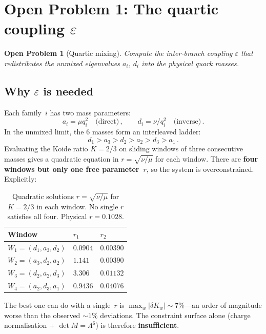 \documentclass[12pt,a4paper]{article}
\newtheorem{problem}{Open Problem}
\begin{document}
\section{Open Problem 1: The quartic coupling $\varepsilon$}
\label{sec:quartic}

\begin{problem}[Quartic mixing]
Compute the inter-branch coupling $\varepsilon$ that redistributes the
unmixed eigenvalues $a_i$, $d_i$ into the physical quark masses.
\end{problem}

\subsection{Why $\varepsilon$ is needed}

Each family~$i$ has two mass parameters:
\begin{equation}
  a_i = \mu q_i^2 \quad \text{(direct)}\,, \qquad
  d_i = \nu/q_i^2 \quad \text{(inverse)}\,.
\end{equation}
In the unmixed limit, the 6 masses form an interleaved ladder:
\begin{equation}
  d_1 > a_3 > d_2 > a_2 > d_3 > a_1\,.
\end{equation}
Evaluating the Koide ratio $K = 2/3$ on sliding windows of three
consecutive masses gives a quadratic equation in $r = \sqrt{\nu/\mu}$
for each window.  There are \textbf{four windows but only one free
parameter~$r$}, so the system is overconstrained.  Explicitly:

\begin{table}[h]
\centering
\caption{Quadratic solutions $r = \sqrt{\nu/\mu}$ for $K = 2/3$ in each window.
No single $r$ satisfies all four.  Physical $r = 0.1028$.}
\begin{tabular}{lll}
  \toprule
  Window & $r_1$ & $r_2$ \\
  \midrule
  $W_1 = (d_1, a_3, d_2)$ & $0.0904$ & $0.00390$ \\
  $W_2 = (a_3, d_2, a_2)$ & $1.141$ & $0.00390$ \\
  $W_3 = (d_2, a_2, d_3)$ & $3.306$ & $0.01132$ \\
  $W_4 = (a_2, d_3, a_1)$ & $0.9436$ & $0.04076$ \\
  \bottomrule
\end{tabular}
\end{table}

\noindent The best one can do with a single~$r$ is
$\max_w |\delta K_w| \sim 7\%$---an order of magnitude worse than
the observed $\sim 1\%$ deviations.  The constraint surface alone
(charge normalisation + $\det M = \Lambda^6$) is therefore
\textbf{insufficient}.
\end{document}
